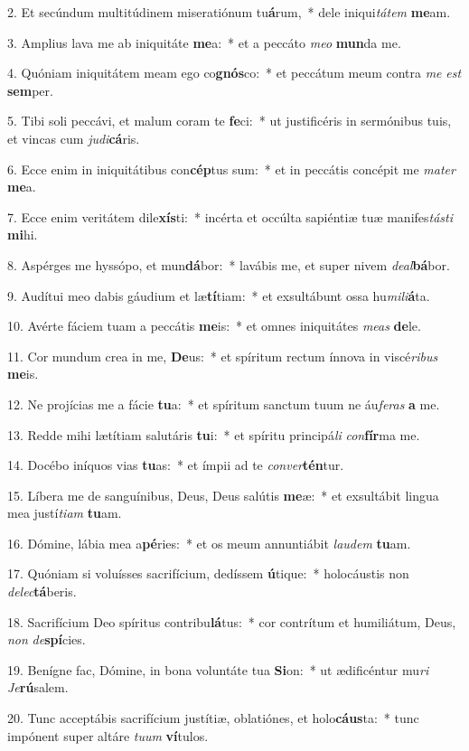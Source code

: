 ﻿2. Et secúndum multitúdinem miseratiónum tu\textbf{á}rum,~* dele iniqui\textit{tá}\textit{tem} \textbf{me}am.

3. Amplius lava me ab iniquitáte \textbf{me}a:~* et a peccáto \textit{me}\textit{o} \textbf{mun}da me.

4. Quóniam iniquitátem meam ego co\textbf{gnós}co:~* et peccátum meum contra \textit{me} \textit{est} \textbf{sem}per.

5. Tibi soli peccávi, et malum coram te \textbf{fe}ci:~* ut justificéris in sermónibus tuis, et vincas cum \textit{ju}\textit{di}\textbf{cá}ris.

6. Ecce enim in iniquitátibus con\textbf{cép}tus sum:~* et in peccátis concépit me \textit{ma}\textit{ter} \textbf{me}a.

7. Ecce enim veritátem dile\textbf{xís}ti:~* incérta et occúlta sapiéntiæ tuæ manifes\textit{tás}\textit{ti} \textbf{mi}hi.

8. Aspérges me hyssópo, et mun\textbf{dá}bor:~* lavábis me, et super nivem \textit{de}\textit{al}\textbf{bá}bor.

9. Audítui meo dabis gáudium et læ\textbf{tí}tiam:~* et exsultábunt ossa hu\textit{mi}\textit{li}\textbf{á}ta.

10. Avérte fáciem tuam a peccátis \textbf{me}is:~* et omnes iniquitátes \textit{me}\textit{as} \textbf{de}le.

11. Cor mundum crea in me, \textbf{De}us:~* et spíritum rectum ínnova in viscé\textit{ri}\textit{bus} \textbf{me}is.

12. Ne projícias me a fácie \textbf{tu}a:~* et spíritum sanctum tuum ne áu\textit{fe}\textit{ras} \textbf{a} me.

13. Redde mihi lætítiam salutáris \textbf{tu}i:~* et spíritu principá\textit{li} \textit{con}\textbf{fír}ma me.

14. Docébo iníquos vias \textbf{tu}as:~* et ímpii ad te \textit{con}\textit{ver}\textbf{tén}tur.

15. Líbera me de sanguínibus, Deus, Deus salútis \textbf{me}æ:~* et exsultábit lingua mea justí\textit{ti}\textit{am} \textbf{tu}am.

16. Dómine, lábia mea a\textbf{pé}ries:~* et os meum annuntiábit \textit{lau}\textit{dem} \textbf{tu}am.

17. Quóniam si voluísses sacrifícium, dedíssem \textbf{ú}tique:~* holocáustis non \textit{de}\textit{lec}\textbf{tá}beris.

18. Sacrifícium Deo spíritus contribu\textbf{lá}tus:~* cor contrítum et humiliátum, Deus, \textit{non} \textit{de}\textbf{spí}cies.

19. Benígne fac, Dómine, in bona voluntáte tua \textbf{Si}on:~* ut ædificéntur mu\textit{ri} \textit{Je}\textbf{rú}salem.

20. Tunc acceptábis sacrifícium justítiæ, oblatiónes, et holo\textbf{cáus}ta:~* tunc impónent super altáre \textit{tu}\textit{um} \textbf{ví}tulos.